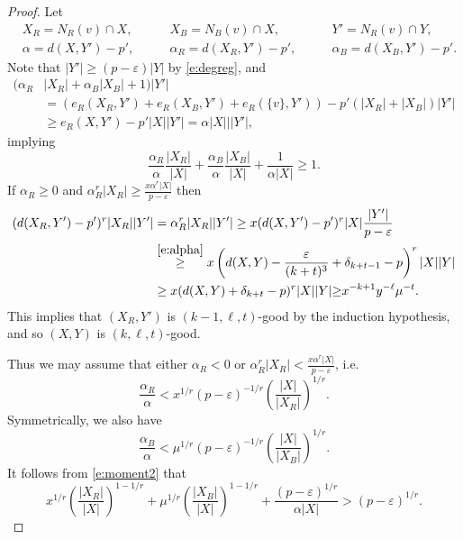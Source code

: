 \documentclass[reqno,final,12pt]{amsart}
\newcommand{\eps}{\varepsilon}
\newcommand{\fs}[2]{\left(\frac{#1}{#2}\right)}
\newcommand{\s}[1]{\left(#1\right)}
\begin{document}
\begin{proof}
Let \begin{align*} &X_R = N_{R}(v) \cap X,\qquad &X_B =N_{B}(v) \cap X,\qquad  &Y'=N_{R}(v) \cap Y, \\ &\alpha = d(X,Y')-p', \qquad &\alpha_R = d(X_R,Y')-p', \qquad &\alpha_B = d(X_B,Y')-p'.\end{align*} Note that $|Y'| \geq (p-\eps)|Y|$ by \eqref{e:degreg}, and 
\begin{align*} 
(\alpha_R&|X_R|+\alpha_B|X_B| + 1)|Y'|\\ &=(e_R(X_R,Y')+e_R(X_B,Y')+e_R(\{v\},Y'))-p'(|X_R|+|X_B|)|Y'|\\ &\geq e_R(X,Y')-p'|X||Y'| = \alpha|X|||Y'|,
\end{align*}
implying
\begin{equation}\label{e:moment2}
\frac{\alpha_R}{\alpha}\frac{|X_R|}{|X|} +\frac{\alpha_B}{\alpha}\frac{|X_B|}{|X|} + \frac{1}{\alpha|X|}\geq 1.
\end{equation} 
If $\alpha_R \geq 0$ and 
$\alpha_R^r|X_R| \geq \frac{x\alpha^r|X|}{p-\eps}$ then \begin{align*} (d(X_R,Y')-p')^r|X_R||Y'| &=\alpha_R^r|X_R||Y'|  \geq x(d(X,Y')  - p')^r|X|\frac{|Y'|}{p-\eps} \\&\stackrel{\eqref{e:alpha}}{\geq} x\s{d(X,Y) -\frac{\eps}{(k+t)^3}+ \delta_{k+t-1} - p}^r|X||Y| \\ &\geq x(d(X,Y) + \delta_{k+t} - p)^r|X||Y| {\geq} x^{-k+1}y^{-\ell}\mu^{-t}.\end{align*}
This implies that $(X_R,Y')$ is $(k-1,\ell,t)$-good by the induction hypothesis, and so $(X,Y)$ is $(k,\ell,t)$-good.

Thus we may assume that either $\alpha_R < 0$ or  $\alpha_R^r|X_R| < \frac{x\alpha^r|X|}{p-\eps}$, i.e. $$\frac{\alpha_R}{\alpha} < x^{1/r}(p-\eps)^{-1/r}\fs{|X|}{|X_R|}^{1/r}.$$ Symmetrically, we also have $$\frac{\alpha_B}{\alpha} <  \mu^{1/r}(p-\eps)^{-1/r}\fs{|X|}{|X_B|}^{1/r}.$$
It follows from \eqref{e:moment2} that
\begin{equation}\label{e:moment3}
x^{1/r}\fs{|X_R|}{|X|}^{1-1/r}+\mu^{1/r}\fs{|X_B|}{|X|}^{1-1/r}+ \frac{(p-\eps)^{1/r}}{\alpha|X|} >(p-\eps)^{1/r}. 
\end{equation}


\end{proof}
\end{document}
